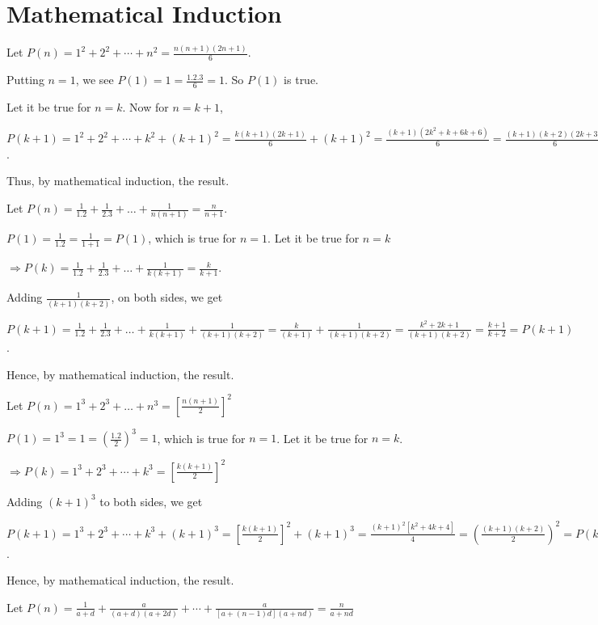 \chapter{Mathematical Induction}
\startitemize[n, 1*broad]
\item Let $P(n) = 1^2 + 2^2 + \cdots + n^2 = \frac{n(n + 1)(2n + 1)}{6}$.

  Putting $n = 1$, we see $P(1) = 1 = \frac{1.2.3}{6} = 1$. So $P(1)$ is true.

  Let it be true for $n = k$. Now for $n = k + 1$,

  $P(k + 1) = 1^2 + 2^2 + \cdots + k^2 + (k + 1)^2 =  \frac{k(k + 1)(2k + 1)}{6} + (k + 1)^2 = \frac{(k +
    1)(2k^2 + k + 6k + 6)}{6} = \frac{(k + 1)(k + 2)(2k + 3)}{6} = P(k + 1)$.

  Thus, by mathematical induction, the result.
\item Let $P(n) = \frac{1}{1.2} + \frac{1}{2.3} + \ldots + \frac{1}{n(n + 1)} = \frac{n}{n + 1}$.

  $P(1) = \frac{1}{1.2} = \frac{1}{1 + 1} = P(1)$, which is true for $n = 1$. Let it be true for $n = k$

  $\Rightarrow P(k) = \frac{1}{1.2} + \frac{1}{2.3} + \ldots + \frac{1}{k(k + 1)} = \frac{k}{k + 1}$.

  Adding $\frac{1}{(k + 1)(k + 2)}$, on both sides, we get

  $P(k + 1) = \frac{1}{1.2} + \frac{1}{2.3} + \ldots + \frac{1}{k(k + 1)} + \frac{1}{(k + 1)(k + 2)} =
  \frac{k}{(k + 1)} + \frac{1}{(k + 1)(k + 2)} = \frac{k^2 + 2k + 1}{(k + 1)(k + 2)} = \frac{k + 1}{k + 2} =
  P(k +1)$.

  Hence, by mathematical induction, the result.
\item Let $P(n) = 1^3 + 2^3 + \ldots + n^3 = \left[\frac{n(n + 1)}{2}\right]^2$

  $P(1) = 1^3 = 1 = \left(\frac{1.2}{2}\right)^3 = 1$, which is true for $n = 1$. Let it be true for $n =
  k$.

  $\Rightarrow P(k) = 1^3 + 2^3 + \cdots + k^3 = \left[\frac{k(k + 1)}{2}\right]^2$

  Adding $(k + 1)^3$ to both sides, we get

  $P(k + 1) = 1^3 + 2^3 + \cdots + k^3 + (k + 1)^3= \left[\frac{k(k + 1)}{2}\right]^2 + (k + 1)^3 = \frac{(k
    + 1)^2[k^2 + 4k + 4]}{4} = \left(\frac{(k + 1)(k + 2)}{2}\right)^2 = P(k + 1)$.

  Hence, by mathematical induction, the result.
\item Let $P(n) = \frac{1}{a + d} + \frac{a}{(a + d)(a + 2d)} + \cdots + \frac{a}{[a + (n - 1)d](a + nd)} =
  \frac{n}{a + nd}$

